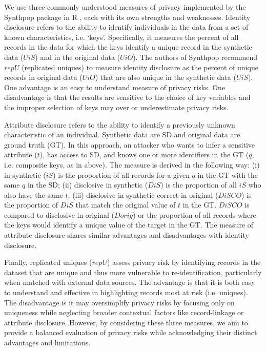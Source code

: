 \documentclass[runningheads]{llncs}
\begin{document}
We use three commonly understood measures of privacy implemented by the Synthpop package in R \cite{raab2024practical,elliot_etal_2020,raab2024practical}, each with its own strengths and weaknesses. Identity disclosure refers to the ability to identify individuals in the data from a set of known characteristics, i.e. `keys'. Specifically, it measures the percent of all records in the data for which the keys identify a unique record in the synthetic data ($UiS$) and in the original data ($UiO$).  The authors of Synthpop recommend $repU$ (replicated uniques) to measure identity disclosure as the percent of unique records in original data ($UiO$) that are also unique in the synthetic data ($UiS$).  One advantage is an easy to understand measure of privacy risks.  One disadvantage is that the results are sensitive to the choice of key variables and the improper selection of keys may over or underestimate privacy risks.

Attribute disclosure refers to the ability to identify a previously unknown characteristic of an individual.  Synthetic data are SD and original data are ground truth (GT).  In this approach, an attacker who wants to infer a sensitive attribute ($t$), has access to SD, and knows one or more identifiers in the GT ($q$, i.e. composite keys, as in above).  The measure is derived in the following way: (i) in synthetic ($iS$) is the proportion of all records for a given $q$ in the GT with the same $q$ in the SD; (ii) disclosive in synthetic ($DiS$) is the proportion of all $iS$ who also have the same $t$; (iii) disclosive in synthetic correct in original ($DiSCO$) is the proportion of $DiS$ that match the original value of $t$ in the GT.  $DiSCO$ is compared to disclosive in original ($Dorig$) or the proportion of all records where the keys would identify a unique value of the target in the GT.  The measure of attribute disclosure shares similar advantages and disadvantages with identity disclosure.

Finally, replicated uniques ($repU$) assess privacy risk by identifying records in the dataset that are unique and thus more vulnerable to re-identification, particularly when matched with external data sources. The advantage is that it is both easy to understand and effective in highlighting records most at risk (i.e. uniques).  The disadvantage is it may oversimplify privacy risks by focusing only on uniqueness while neglecting broader contextual factors like record-linkage or attribute disclosure.  However, by considering these three measures, we aim to provide a balanced evaluation of privacy risks while acknowledging their distinct advantages and limitations.  
\end{document}
